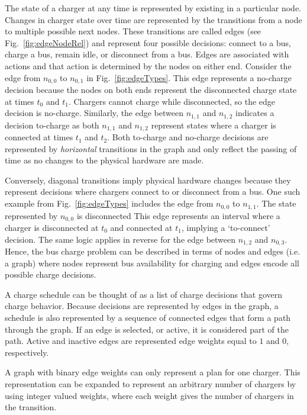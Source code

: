\par The state of a charger at any time is represented by existing in a particular node. Changes in charger state over time are represented by the transitions from a node to multiple possible next nodes. These transitions are called edges (see Fig.~\ref{fig:edgeNodeRel}) and represent four possible decisions: connect to a bus, charge a bus, remain idle, or disconnect from a bus. Edges are associated with actions and that action is determined by the nodes on either end. Consider the edge from $n_{0,0}$ to $n_{0,1}$ in Fig.~\ref{fig:edgeTypes}. This edge represents a no-charge decision because the nodes on both ends represent the disconnected charge state at times $t_0$ and $t_1$. Chargers cannot charge while disconnected, so the edge decision is no-charge.  Similarly, the edge between $n_{1,1}$ and $n_{1,2}$ indicates a decision to-charge as both $n_{1,1}$ and $n_{1,2}$ represent states where a charger is connected at times $t_1$ and $t_2$. Both to-charge and no-charge decisions are represented by \textit{horizontal} transitions in the graph and only reflect the passing of time as no changes to the physical hardware are made.
\par Conversely, diagonal transitions imply physical hardware changes because they represent decisions where chargers connect to or disconnect from a bus. One such example from Fig.~\ref{fig:edgeTypes} includes the edge from $n_{0,0}$ to $n_{1,1}$. The state represented by $n_{0,0}$ is disconnected This edge represents an interval where a charger is disconnected at $t_0$ and connected at $t_1$, implying a `to-connect' decision. The same logic applies in reverse for the edge between $n_{1,2}$ and $n_{0,3}$. Hence, the bus charge problem can be described in terms of nodes and edges (i.e. a graph) where nodes represent bus availability for charging and edges encode all possible charge decisions. 
\par A charge schedule can be thought of as a list of charge decisions that govern charge behavior. Because decisions are represented by edges in the graph, a schedule is also represented by a sequence of connected edges that form a path through the graph. If an edge is selected, or active, it is considered part of the path.  Active and inactive edges are represented edge weights equal to $1$ and $0$, respectively.
\par A graph with binary edge weights can only represent a plan for one charger. This representation can be expanded to represent an arbitrary number of chargers by using integer valued weights, where each weight gives the number of chargers in the transition.
